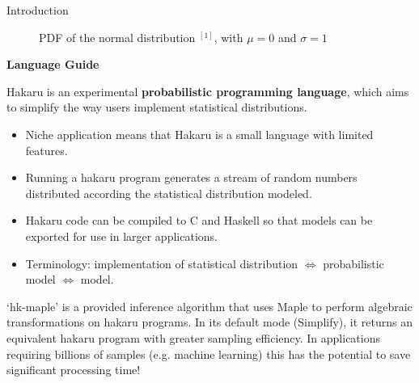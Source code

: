 \documentclass[22pt]{beamer}
\begin{document}
\begin{frame}[fragile]
\begin{textblock}{5}
\begin{block}{\Large{Introduction}}
\begin{figure}
\caption{\tiny{PDF of the normal distribution $^{[1]}$, with $\mu = 0$ and $\sigma = 1$}}
\end{figure}

\normalsize{\textbf{Language Guide}}

\bigskip
\scriptsize{Hakaru is an experimental \textbf{probabilistic programming language}, which aims to simplify the way users implement statistical distributions. 

\begin{itemize}
    \item Niche application means that Hakaru is a small language with limited features.
    \item Running a hakaru program generates a stream of random numbers distributed according the statistical distribution modeled.
    \item Hakaru code can be compiled to C and Haskell so that models can be exported for use in larger applications.
    \item Terminology: implementation of statistical distribution $\Longleftrightarrow$ probabilistic model $\Longleftrightarrow$ model.
\end{itemize}

}

\bigskip
\scriptsize{`hk-maple' is a provided inference algorithm that uses Maple to perform algebraic transformations on hakaru programs. In its default mode (Simplify), it returns an equivalent hakaru program with greater sampling efficiency. In applications requiring billions of samples (e.g. machine learning) this has the potential to save significant processing time!}

\end{block}



\end{textblock}
\end{frame}
\end{document}
